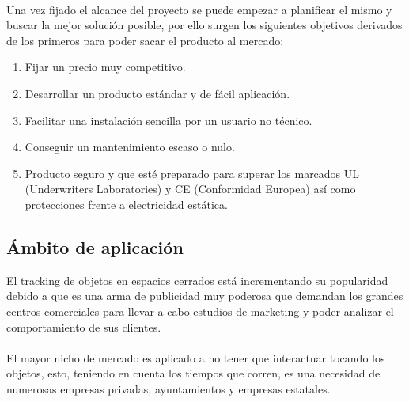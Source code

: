 \documentclass[paper=a4, fontsize=11pt,twoside]{scrartcl}	%
\begin{document}
        \paragraph{}
        Una vez fijado el alcance del proyecto se puede empezar a planificar el mismo y buscar la mejor solución 
        posible, por ello surgen los siguientes objetivos derivados de los primeros para poder sacar el producto 
        al mercado:
        \begin{enumerate}
            \item Fijar un precio muy competitivo.
            \item Desarrollar un producto estándar y de fácil aplicación.
            \item Facilitar una instalación sencilla por un usuario no técnico.
            \item Conseguir un mantenimiento escaso o nulo.
            \item Producto seguro y que esté preparado para superar los marcados UL
            (Underwriters Laboratories) y CE (Conformidad Europea) así como protecciones frente a electricidad estática.
        \end{enumerate}
    \subsection{Ámbito de aplicación}
        El tracking de objetos en espacios cerrados está incrementando su popularidad debido a que es una 
        arma de publicidad muy poderosa que demandan los grandes centros comerciales para llevar a cabo estudios de marketing
        y poder analizar el comportamiento de sus clientes.
        \paragraph{}
        El mayor nicho de mercado es aplicado a no tener que interactuar tocando los objetos, 
        esto, teniendo en cuenta los tiempos que corren, es una necesidad de numerosas empresas privadas, ayuntamientos 
        y empresas estatales.
\end{document}
